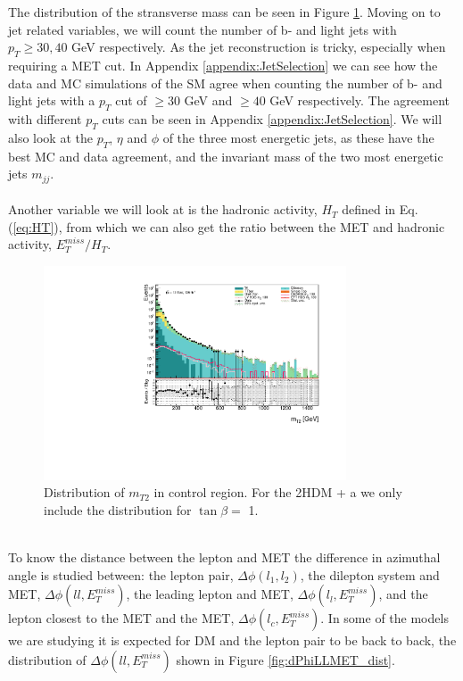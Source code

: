 \documentclass[12pt, a4paper]{book}
\begin{document}
The distribution of the stransverse mass can be seen in Figure \ref{fig:mt2_dist}. Moving on to jet related variables, we will count the number of b- and light jets with $p_T \ge 30, 40$ GeV respectively. As the jet reconstruction is tricky, 
especially when requiring a MET cut. In Appendix \ref{appendix:JetSelection} we can see how the data and MC simulations of the SM agree when counting the number of b- and light jets with a $p_T$ cut of $\ge30$ GeV and $\ge40$ GeV respectively. 
The agreement with different $p_T$ cuts can be seen in Appendix \ref{appendix:JetSelection}. We will also look at the $p_T$, $\eta$ and $\phi$ of the three most energetic jets, as these have the best MC and data agreement, and the invariant mass of the two most energetic jets $m_{jj}$.\\ 
\\Another variable we will look at is the hadronic activity, $H_T$ defined in Eq. (\ref{eq:HT}), from which we can also get the ratio between the MET and hadronic activity, $E_T^{miss}/H_T$.\\
\begin{figure}[!ht]
    \centering
        \includegraphics[width=0.8\textwidth]{mt2.pdf}
    \caption[Distribution of $m_{T2}$ in control region]{Distribution of $m_{T2}$ in control region.  For the 2HDM + a we only include the distribution for $\tan\beta=$ 1.}\label{fig:mt2_dist}
\end{figure}
\graphicspath{{../../../Plots/Data_Analysis/SRs/Control_region/}} 
\\To know the distance between the lepton and MET the difference in azimuthal angle is studied between: the lepton pair, $\Delta\phi(l_1,l_2)$, the dilepton system and MET, $\Delta\phi(ll,E_T^{miss})$, the leading lepton and MET, $\Delta\phi(l_l,E_T^{miss})$, 
and the lepton closest to the MET and the MET, $\Delta\phi(l_c,E_T^{miss})$. In some of the models we are studying it is expected for DM and the lepton pair to be back to back, the distribution of $\Delta\phi(ll,E_T^{miss})$ shown in Figure \ref{fig:dPhiLLMET_dist}.
\end{document}
